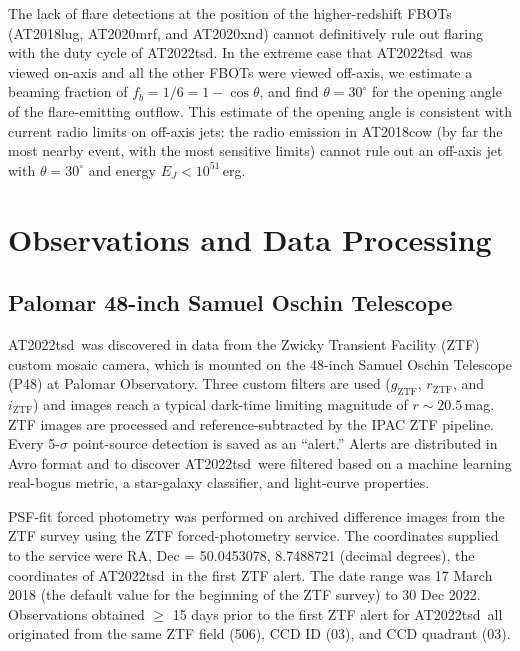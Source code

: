 \documentclass{nature_plusfigure}
\newcommand{\at}{AT2022tsd}
\begin{document}
\begin{methods}
The lack of flare detections at the position of the higher-redshift FBOTs (AT2018lug, AT2020mrf, and AT2020xnd) cannot definitively rule out flaring with the duty cycle of \at. 
In the extreme case that \at\ was viewed on-axis and all the other FBOTs were viewed off-axis, we estimate a beaming fraction of $f_b = 1/6 = 1-\cos{\theta}$, and find $\theta=30^{\circ}$ for the opening angle of the flare-emitting outflow. This estimate of the opening angle is consistent with current radio limits on off-axis jets: the radio emission in AT2018cow (by far the most nearby event, with the most sensitive limits) cannot rule out an off-axis jet with $\theta=30^{\circ}$ and energy $E_J<10^{51}\,$erg\cite{Margutti2019}.

\section{Observations and Data Processing}

\subsection{Palomar 48-inch Samuel Oschin Telescope}

\at\ was discovered in data from the Zwicky Transient Facility (ZTF) custom mosaic camera\cite{Dekany2020}, which is mounted on the 48-inch Samuel Oschin Telescope (P48) at Palomar Observatory.
Three custom filters are used ($g_{\mathrm{ZTF}}$, $r_{\mathrm{ZTF}}$, and $i_{\mathrm{ZTF}}$\cite{Dekany2020})
and images reach a typical dark-time limiting magnitude of $r\sim20.5\,$mag.
ZTF images are processed and reference-subtracted
by the IPAC ZTF pipeline\cite{Masci2019}.
Every 5-$\sigma$ point-source detection is saved as an ``alert.''
Alerts are distributed in Avro format\cite{Patterson2019} and to discover \at\ were filtered based on a machine learning real-bogus metric\cite{Duev2019}, a star-galaxy classifier\cite{Tachibana2018}, and light-curve properties.

PSF-fit forced photometry was performed on archived difference images from the ZTF survey using the ZTF forced-photometry service\cite{Masci2019}. The coordinates supplied to the service were RA, Dec = 50.0453078, 8.7488721 (decimal degrees), the coordinates of \at\ in the first ZTF alert. The date range was 17 March 2018 (the default value for the beginning of the ZTF survey) to 30 Dec 2022.
Observations obtained $\geq$ 15 days prior to the first ZTF alert for \at\ all originated from the same ZTF field (506), CCD ID (03), and CCD quadrant (03). 


\end{methods}
\end{document}
